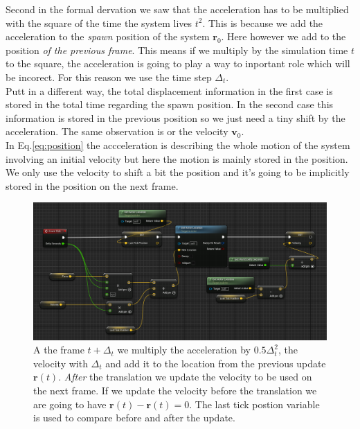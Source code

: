 \documentclass[../main.tex]{subfile}
\begin{document}
    Second in the formal dervation we saw that the acceleration has to be multiplied with the square of the time the system lives $t^2$. This is because we add the
    acceleration to the \textit{spawn} position of the system $\bm{r}_0$. Here however we add to the position \textit{of the previous frame}. This means if we multiply by the simulation 
    time $t$ to the square, the acceleration is going to play a way to inportant role which will be incorect. For this reason we use the time step $\Delta_t$. \\
    Putt in a different way, the total displacement information in the first case is stored in the total time regarding the spawn position. In the second case
    this information is stored in the previous position so we just need a tiny shift by the acceleration. The same observation is or the velocity $\bm{v}_0$.\\

    In Eq.\ref{eq:position} the accceleration is describing the whole motion of the system involving an initial velocity but here the motion is mainly stored in the position.
    We only use the velocity to shift a bit the position and it's going to be implicitly stored in the position on the next frame.\\
    \begin{figure}[H]
        \centering
        \includegraphics[width=1\textwidth]{Ressources/TailUpdateLocation.png}
        \caption{A the frame $t+\Delta_t$ we multiply the acceleration by $0.5\Delta_t^2$, the velocity with $\Delta_t$ and add it to the location from the previous update $\bm{r}(t)$. 
        \textit{After} the translation we update the velocity to be used on the next frame. If we update the velocity before the translation we are going to have $\bm{r}(t) - \bm{r}(t) = 0$.
        The last tick postion variable is used to compare before and after the update.}
    \end{figure}
\end{document}
